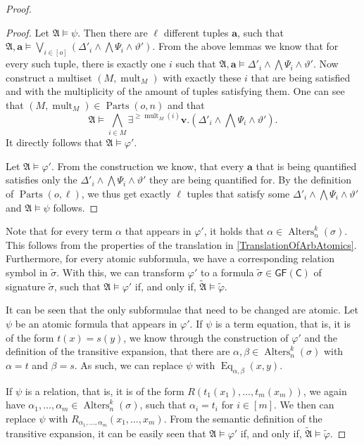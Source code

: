 \documentclass[a4paper,11pt,DIV=15]{scrartcl} %
\renewcommand{\phi}{\varphi}
\theoremstyle{plain}
\theoremstyle{definition}
\newcommand{\GFC}{\mathsf{GF}(\mathsf{C})}
\renewcommand{\theta}{\vartheta}
\begin{document}
\begin{proof}
\begin{proof}
		Let $\mathfrak A\models \psi$.
		Then there are $\ell$ different tuples $\mathbf a$, such that $\mathfrak A,\mathbf a \models \bigvee_{i\in[o]}(\Delta'_i\land\bigwedge\Psi_i\land\theta')$.
		From the above lemmas we know that for every such tuple, there is exactly one $i$ such that $\mathfrak A,\mathbf a\models \Delta'_i\land\bigwedge \Psi_i\land \theta'$.
		Now construct a multiset $(M,\operatorname{mult}_M)$ with exactly these $i$ that are being satisfied and with the multiplicity of the amount of tuples satisfying them.
		One can see that $(M,\operatorname{mult}_M)\in \operatorname{Parts}(o,n)$ and that 
		$$\mathfrak A \models \bigwedge_{i\in M}\exists^{\geq\operatorname{mult}_M(i)}\mathbf v. (\Delta'_i\land \bigwedge\Psi_i\land \theta').$$
		It directly follows that $\mathfrak A\models \phi'$.
		
		Let $\mathfrak A\models \phi'$.
		From the construction we know, that every $\mathbf a$ that is being quantified satisfies only the $\Delta'_i\land\bigwedge\Psi_i\land\theta'$ they are being quantified for.
		By the definition of $\operatorname{Parts}(o,\ell)$, we thus get exactly $\ell$ tuples that satisfy some $\Delta'_i\land\bigwedge\Psi_i\land\theta'$ and $\mathfrak A\models \psi$ follows.
	\end{proof}
	
	Note that for every term $\alpha$ that appears in $\phi'$, it holds that $\alpha\in \operatorname{Alters}^k_n(\sigma)$.
	This follows from the properties of the translation in \cref{TranslationOfArbAtomics}.
	Furthermore, for every atomic subformula, we have a corresponding relation symbol in $\widetilde{\sigma}$.
	With this, we can transform $\phi'$ to a formula $\widetilde{\sigma}\in\GFC$ of signature $\widetilde{\sigma}$, such that $\mathfrak A\models \phi'$ if, and only if, $\widetilde{\mathfrak A}\models \widetilde{\phi}$.
	
	It can be seen that the only subformulae that need to be changed are atomic.
	Let $\psi$ be an atomic formula that appears in $\phi'$.
	If $\psi$ is a term equation, that is, it is of the form $t(x)=s(y)$, we know through the construction of $\phi'$ and the definition of the transitive expansion, that there are $\alpha,\beta\in \operatorname{Alters}^k_n(\sigma)$ with $\alpha=t$ and $\beta=s$. 
	As such, we can replace $\psi$ with $\operatorname{Eq}_{\alpha,\beta}(x,y)$.
	
	If $\psi$ is a relation, that is, it is of the form $R(t_1(x_1),\dots,t_m(x_m))$, we again have $\alpha_1,\dots,\alpha_m\in \operatorname{Alters}^k_n(\sigma)$, such that $\alpha_i=t_i$ for $i\in[m]$.
	We then can replace $\psi$ with $R_{\alpha_1,\dots,\alpha_m}(x_1,\dots,x_m)$.
	From the semantic definition of the transitive expansion, it can be easily seen that $\mathfrak A\models \phi'$ if, and only if, $\widetilde{\mathfrak A}\models \widetilde{\phi}$.
		

\end{proof}
\end{document}
